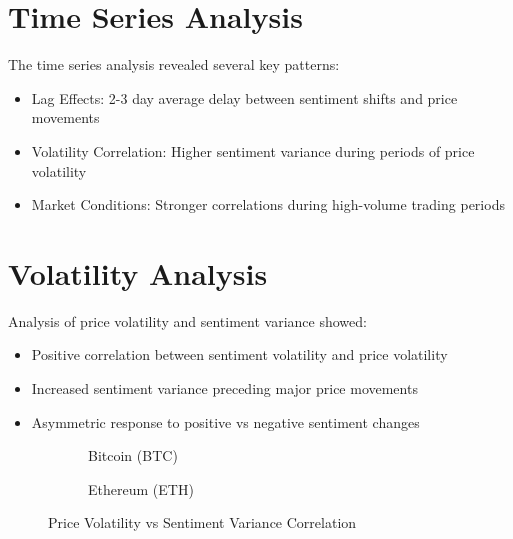 \documentclass[12pt,a4paper]{report}
\begin{document}
\section{Time Series Analysis}
The time series analysis revealed several key patterns:
\begin{itemize}
    \item Lag Effects: 2-3 day average delay between sentiment shifts and price movements
    \item Volatility Correlation: Higher sentiment variance during periods of price
          volatility
    \item Market Conditions: Stronger correlations during high-volume trading periods
\end{itemize}
%     
\section{Volatility Analysis}
Analysis of price volatility and sentiment variance showed:
\begin{itemize}
    \item Positive correlation between sentiment volatility and price volatility
    \item Increased sentiment variance preceding major price movements
    \item Asymmetric response to positive vs negative sentiment changes
\end{itemize}
\begin{figure}[H]
    \centering
    \begin{subfigure}[b]{0.48\textwidth}
        
        \caption{Bitcoin (BTC)}
    \end{subfigure}
    \hfill
    \begin{subfigure}[b]{0.48\textwidth}
        
        \caption{Ethereum (ETH)}
    \end{subfigure}
    \caption{Price Volatility vs Sentiment Variance Correlation}
\end{figure}
\end{document}
